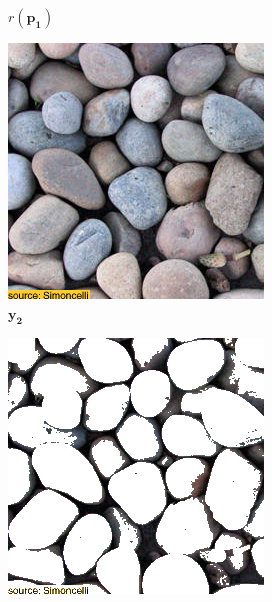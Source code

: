 \begin{figure}[ht]
\begin{subfigure}{\textwidth}
\begin{subfigure}{0.2\textwidth}
            \caption*{\(r(\bm{p_1})\)}
            \label{fig:intro_pixels_vs_stats-pixels_proj}
        \end{subfigure}
        
        \begin{subfigure}{0.2\textwidth}
            \centering
            \includegraphics[width=\textwidth]{images/01-pixels_vs_stats-stats_target.jpg}
            \caption*{\(\bm{y_2}\)}
            \label{fig:intro_pixels_vs_stats-stats_target}
        \end{subfigure}
        \hfill
        \begin{subfigure}{0.2\textwidth}
            \centering
            \includegraphics[width=\textwidth]{images/01-pixels_vs_stats-bg.jpg}

\end{subfigure}
\end{subfigure}
\end{figure}
